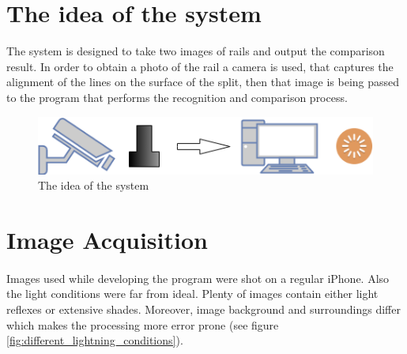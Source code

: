 \section{The idea of the system}
The system is designed to take two images of rails and output the comparison result. In order to obtain a photo of the rail a camera is used, that captures the alignment of the lines on the surface of the split, then that image is being passed to the program that performs the recognition and comparison process.
\begin{figure}[h]
	\centering
	\includegraphics[width=\textwidth]{images/deployment_diagram}
	\caption{The idea of the system}
\end{figure}

\section{Image Acquisition}
\paragraph{}
Images used while developing the program were shot on a regular iPhone. Also the light conditions were far from ideal. Plenty of images contain either light reflexes or extensive shades. Moreover, image background and surroundings differ which makes the processing more error prone (see figure \ref{fig:different_lightning_conditions}).

